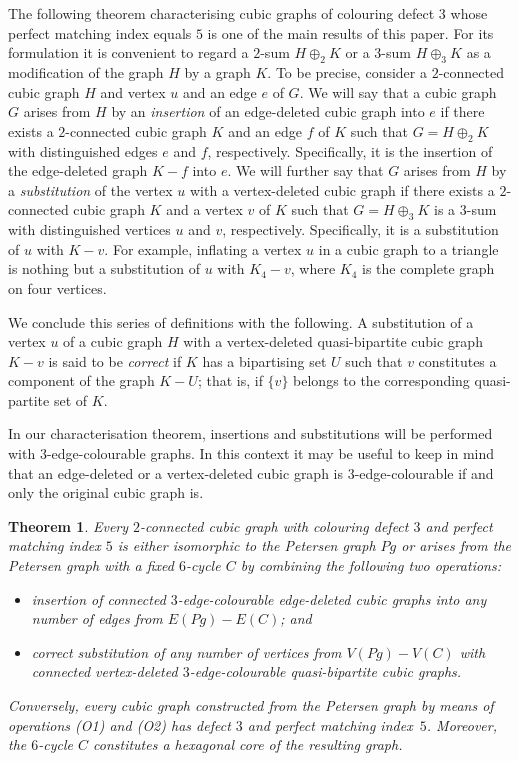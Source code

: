 \documentclass[a4paper]{amsart}
\theoremstyle{plain}
\newtheorem{theorem}{Theorem}[section]
\theoremstyle{definition}
\begin{document}
The following theorem characterising cubic graphs of colouring
defect $3$ whose perfect matching index equals $5$ is one of
the main results of this paper. For its formulation it is
convenient to regard a $2$-sum $H\oplus_2 K$ or a $3$-sum
$H\oplus_3 K$ as a modification of the graph $H$ by a graph
$K$. To be precise, consider a $2$-connected cubic graph $H$
and vertex $u$ and an edge $e$ of $G$. We will say that a cubic
graph $G$ arises from $H$ by an \emph{insertion} of an
edge-deleted cubic graph into $e$ if there exists a
$2$-connected cubic graph $K$ and an edge $f$ of $K$ such that
$G=H\oplus_2 K$ with distinguished edges $e$ and $f$,
respectively. Specifically, it is the insertion of the
edge-deleted graph $K-f$ into $e$. We will further say that $G$
arises from $H$ by a \emph{substitution} of the vertex $u$ with
a vertex-deleted cubic graph if there exists a $2$-connected
cubic graph $K$ and a vertex $v$ of $K$ such that $G=H\oplus_3
K$ is a $3$-sum with distinguished vertices $u$ and $v$,
respectively. Specifically, it is a substitution of $u$ with
$K-v$. For example, inflating a vertex $u$ in a cubic graph to
a triangle is nothing but a substitution of $u$ with $K_4-v$,
where $K_4$ is the complete graph on four vertices.

We conclude this series of definitions with the following. A
substitution of a vertex $u$ of a cubic graph $H$ with a
vertex-deleted quasi-bipartite cubic graph $K-v$ is said to be
\emph{correct} if $K$ has a bipartising set $U$ such that $v$
constitutes a component of the graph $K-U$; that is, if $\{v\}$
belongs to the corresponding quasi-partite set of $K$.

In our characterisation theorem, insertions and substitutions
will be performed with $3$-edge-colourable graphs. In this
context it may be useful to keep in mind that an edge-deleted
or a vertex-deleted cubic graph is $3$-edge-colourable if and
only the original cubic graph is.

\begin{theorem}\label{thm:main}
Every $2$-connected cubic graph with colouring defect $3$ and
perfect matching index $5$ is either isomorphic to the Petersen
graph $Pg$ or arises from the Petersen graph with a fixed
$6$-cycle $C$ by combining the following two operations:
\begin{itemize}
\item[{\rm (O1)}] insertion of connected
    $3$-edge-colourable edge-deleted cubic graphs into any
    number of edges from $E(Pg)-E(C)$; and
\item[{\rm (O2)}] correct substitution of any number of
    vertices from $V(Pg)-V(C)$ with connected
    vertex-deleted $3$-edge-colourable quasi-bipartite
    cubic graphs.
\end{itemize}
Conversely, every cubic graph constructed from the Petersen
graph by means of operations {\rm (O1)} and {\rm (O2)} has
defect $3$ and perfect matching index~$5$. Moreover, the
$6$-cycle $C$ constitutes a hexagonal core of the resulting
graph.
\end{theorem}
\end{document}
